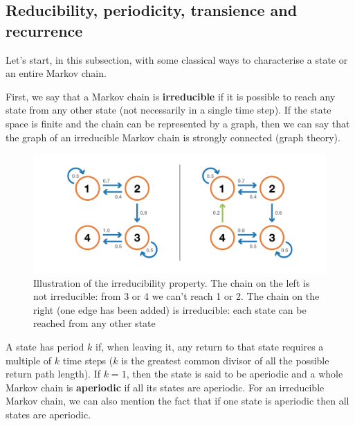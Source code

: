 \subsection{Reducibility, periodicity, transience and recurrence}
Let's start, in this subsection, with some classical ways to characterise a state or an entire Markov chain.

First, we say that a Markov chain is \textbf{irreducible} if it is possible to reach any state from any other state (not necessarily in a single time step). If the state space is finite and the chain can be represented by a graph, then we can say that the graph of an irreducible Markov chain is strongly connected (graph theory).

\begin{figure}[h]
    \centering
\includegraphics[width=\textwidth]{pic/p05c07-snip05.png}
    \caption[Illustration of the irreducibility property]{Illustration of the irreducibility property. The chain on the left is not irreducible: from 3 or 4 we can't reach 1 or 2. The chain on the right (one edge has been added) is irreducible: each state can be reached from any other state}
    \label{fig:p05c07-snip05}
\end{figure}


A state has period $k$ if, when leaving it, any return to that state requires a multiple of $k$ time steps ($k$ is the greatest common divisor of all the possible return path length). If $k = 1$, then the state is said to be aperiodic and a whole Markov chain is \textbf{aperiodic} if all its states are aperiodic. For an irreducible Markov chain, we can also mention the fact that if one state is aperiodic then all states are aperiodic.



